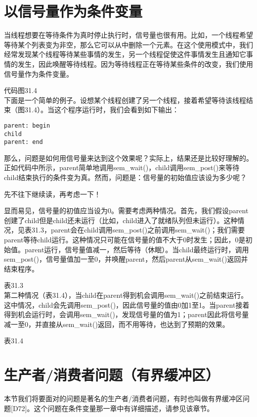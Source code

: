 \section{以信号量作为条件变量}
当线程想要在等待条件为真时停止执行时，信号量也很有用。比如，一个线程希望等待某个列表变为非空，那么它可以从中删除一个元素。在这个使用模式中，我们经常发现某个线程等待某些事情的发生，另一个线程促使这件事情发生且通知它事情的发生，因此唤醒等待线程。因为等待线程正在等待某些条件的改变，我们使用信号量作为条件变量。


代码图31.4\\

下面是一个简单的例子。设想某个线程创建了另一个线程，接着希望等待该线程结束（图31.4）。当这个程序运行时，我们会看到如下输出：
\begin{verbatim}
parent: begin
child
parent: end
\end{verbatim}


那么，问题是如何用信号量来达到这个效果呢？实际上，结果还是比较好理解的。正如代码中所示，parent简单地调用sem\_wait()，child调用sem\_post()来等待child结束执行的条件变为真。然而，问题是：信号量的初始值应该设为多少呢？

先不往下继续读，再考虑一下！

显而易见，信号量的初值应当设为0。需要考虑两种情况。首先，我们假设parent创建了child但是child还未运行（比如，child进入了就绪队列但未运行）。这种情况，见表31.3，parent会在child调用sem\_post()之前调用sem\_wait()；我们需要parent等待child运行。这种情况只可能在信号量的值不大于0时发生；因此，0是初始值。parent运行，信号量值减一，然后等待（休眠）。当child最终运行时，调用sem\_post()，信号量值加一至0，并唤醒parent，然后parent从sem\_wait()返回并结束程序。

表31.3\\

第二种情况（表31.4），当child在parent得到机会调用sem\_wait()之前结束运行。这中情况，child会先调用sem\_post()，因此信号量的值由0加1至1。当parent接着得到机会运行时，会调用sem\_wait()，发现信号量的值为1；parent因此将信号量减一至0，并直接从sem\_wait()返回，而不用等待，也达到了预期的效果。

表31.4\\


\section{生产者/消费者问题（有界缓冲区）}
本节我们将要面对的问题是著名的生产者/消费者问题，有时也叫做有界缓冲区问题[D72]。这个问题在条件变量那一章中有详细描述，请参见该章节。

